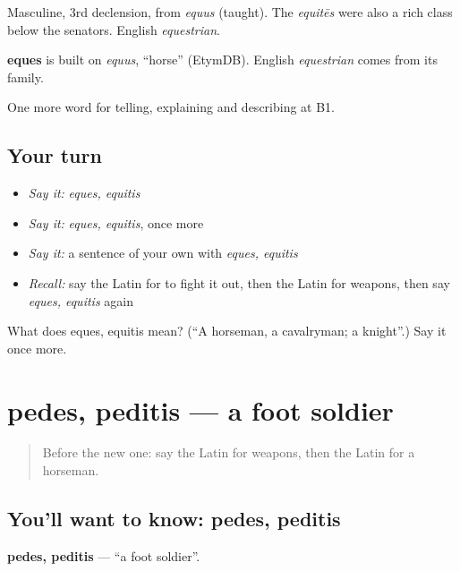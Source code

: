 Masculine, 3rd declension, from \emph{equus} (taught). The \emph{equitēs} were also a rich class below the senators. English \emph{equestrian}.

\begin{cousinweb}
\textbf{eques} is built on \emph{equus}, \textquotedblleft{}horse\textquotedblright{} (EtymDB). English \emph{equestrian} comes from its family.
\end{cousinweb}

\begin{grammarlens}[title={What you've built}]
One more word for telling, explaining and describing at B1.
\end{grammarlens}

\subsection*{Your turn}
\begin{itemize}
\raggedright
  \item \emph{Say it:} \emph{eques, equitis}
  \item \emph{Say it:} \emph{eques, equitis}, once more
  \item \emph{Say it:} a sentence of your own with \emph{eques, equitis}
  \item \emph{Recall:} say the Latin for to fight it out, then the Latin for weapons, then say \emph{eques, equitis} again
\end{itemize}

\begin{tcolorbox}[breakable,colback=teal!4,colframe=teal!35!black,title={Before you move on}]
What does eques, equitis mean? (\textquotedblleft{}A horseman, a cavalryman; a knight\textquotedblright{}.) Say it once more.
\end{tcolorbox}
\section[pedes, peditis]{pedes, peditis — a foot soldier}

\label{lesson:LA-C340-pedes}



\begin{quote}
Before the new one: say the Latin for weapons, then the Latin for a horseman.
\end{quote}

\subsection*{You'll want to know: pedes, peditis}
\textbf{pedes, peditis} — \textquotedblleft{}a foot soldier\textquotedblright{}.

